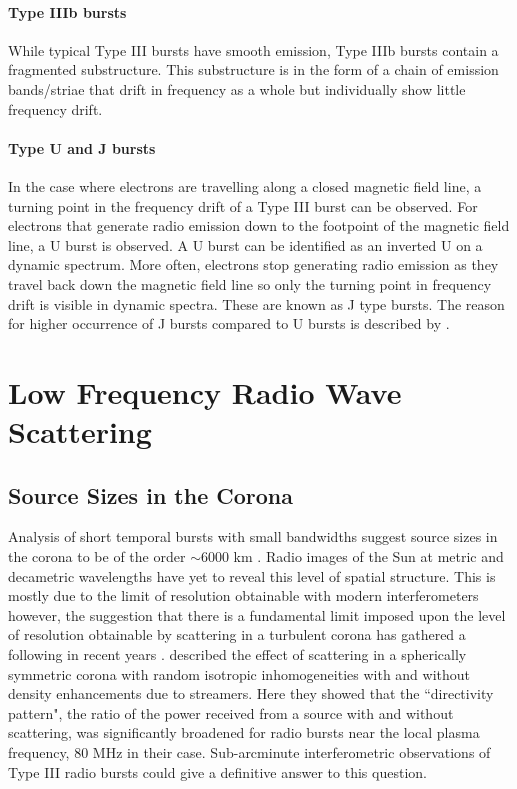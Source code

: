 \paragraph{Type IIIb bursts}
While typical Type III bursts have smooth emission, Type IIIb bursts contain a fragmented substructure. This substructure is in the form of a chain of emission bands/striae that drift in frequency as a whole but individually show little frequency drift.

\paragraph{Type U and J bursts}
In the case where electrons are travelling along a closed magnetic field line, a turning point in the frequency drift of a Type III burst can be observed. For electrons that generate radio emission down to the footpoint of the magnetic field line, a U burst is observed. A U burst can be identified as an inverted U on a dynamic spectrum. More often, electrons stop generating radio emission as they travel back down the magnetic field line so only the turning point in frequency drift is visible in dynamic spectra. These are known as J type bursts. The reason for higher occurrence of J bursts compared to U bursts is described by \cite{Reid2017}.

\section{Low Frequency Radio Wave Scattering}

\subsection{Source Sizes in the Corona}
Analysis of short temporal bursts with small bandwidths suggest source sizes in the corona to be of the order $\sim 6000$ km \citep{McConnell1980}. Radio images of the Sun at metric and decametric wavelengths have yet to reveal this level of spatial structure. This is mostly due to the limit of resolution obtainable with modern interferometers however, the suggestion that there is a fundamental limit imposed upon the level of resolution obtainable by scattering in a turbulent corona \citep{Bastian1994} has gathered a following in recent years \citep{Kontar2017}. \cite{Riddle1974} described the effect of scattering in a spherically symmetric corona with random isotropic inhomogeneities with and without density enhancements due to streamers. Here they showed that the ``directivity pattern", the ratio of the power received from a source with and without scattering, was significantly broadened for radio bursts near the local plasma frequency, 80 MHz in their case.
Sub-arcminute interferometric observations of Type III radio bursts could give a definitive answer to this question.

